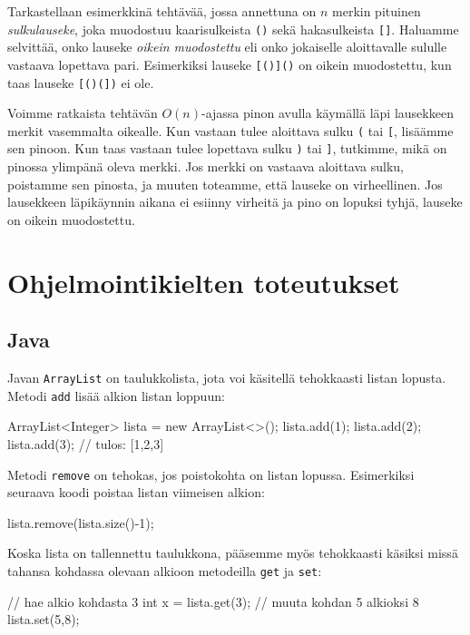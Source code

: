 Tarkastellaan esimerkkinä tehtävää, jossa annettuna on
$n$ merkin pituinen \emph{sulkulauseke}, 
joka muodostuu kaarisulkeista \texttt{()} sekä
hakasulkeista \texttt{[]}.
Haluamme selvittää, onko lauseke \emph{oikein muodostettu} eli
onko jokaiselle aloittavalle sululle vastaava lopettava pari.
Esimerkiksi lauseke \texttt{[()]()} on oikein muodostettu,
kun taas lauseke \texttt{[()(])} ei ole.

Voimme ratkaista tehtävän $O(n)$-ajassa pinon avulla
käymällä läpi lausekkeen merkit vasemmalta oikealle.
Kun vastaan tulee aloittava sulku \texttt{(} tai \texttt{[},
lisäämme sen pinoon.
Kun taas vastaan tulee lopettava sulku \texttt{)} tai \texttt{]},
tutkimme, mikä on pinossa ylimpänä oleva merkki.
Jos merkki on vastaava aloittava sulku,
poistamme sen pinosta, ja muuten toteamme, että lauseke on virheellinen.
Jos lausekkeen läpikäynnin aikana ei esiinny virheitä
ja pino on lopuksi tyhjä, lauseke on oikein muodostettu.

\section{Ohjelmointikielten toteutukset}

\subsection{Java}

Javan \texttt{ArrayList} on taulukkolista,
jota voi käsitellä tehokkaasti listan lopusta.
Metodi \texttt{add} lisää alkion listan loppuun:

\begin{code}
ArrayList<Integer> lista = new ArrayList<>();
lista.add(1);
lista.add(2);
lista.add(3);
// tulos: [1,2,3]
\end{code}

Metodi \texttt{remove} on tehokas,
jos poistokohta on listan lopussa.
Esimerkiksi seuraava koodi poistaa listan
viimeisen alkion:

\begin{code}
lista.remove(lista.size()-1);
\end{code}

Koska lista on tallennettu taulukkona,
pääsemme myös tehokkaasti käsiksi missä tahansa kohdassa
olevaan alkioon metodeilla \texttt{get} ja \texttt{set}:

\begin{code}
// hae alkio kohdasta 3
int x = lista.get(3);
// muuta kohdan 5 alkioksi 8
lista.set(5,8);
\end{code}

